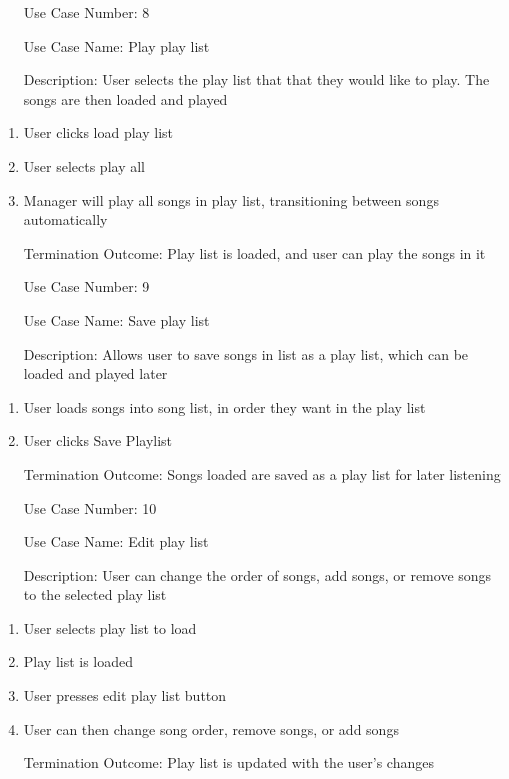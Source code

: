 \documentclass[10pt,conference,onecolumn,compsoc]{IEEEtran}
\begin{document}
\begin{itemize}
\item[Use Case Number:] 8
\item[Use Case Name:] Play play list
\item[Description:] User selects the play list that that they would like to play. The songs are then loaded and played
\end{itemize}

\begin{enumerate}
\item User clicks load play list
\item User selects play all
\item Manager will play all songs in play list, transitioning between songs automatically
\item[Termination Outcome:]	Play list is loaded, and user can play the songs in it
\end{enumerate}

\begin{itemize}
\item[Use Case Number:] 9
\item[Use Case Name:] Save play list
\item[Description:] Allows user to save songs in list as a play list, which can be loaded and played later
\end{itemize}

\begin{enumerate}
\item User loads songs into song list, in order they want in the play list
\item User clicks Save Playlist
\item[Termination Outcome:] Songs loaded are saved as a play list for later listening
\end{enumerate}

\begin{itemize}
\item[Use Case Number:] 10
\item[Use Case Name:] Edit play list
\item[Description:] User can change the order of songs, add songs, or remove songs to the selected play list
\end{itemize}

\begin{enumerate}
\item User selects play list to load
\item Play list is loaded
\item User presses edit play list button
\item User can then change song order, remove songs, or add songs
\item[Termination Outcome:] Play list is updated with the user's changes
\end{enumerate}
\end{document}
